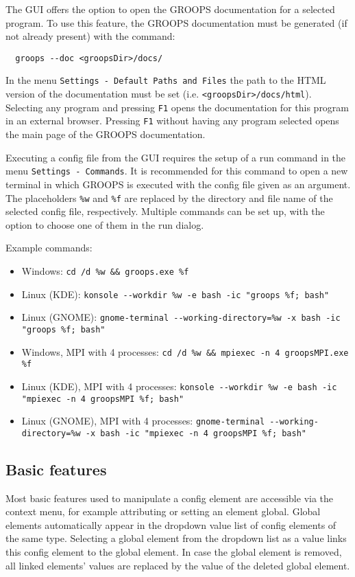 The GUI offers the option to open the GROOPS documentation for a selected program. To use this feature,
the GROOPS documentation must be generated (if not already present) with the command:
\begin{verbatim}
  groops --doc <groopsDir>/docs/
\end{verbatim}
In the menu \verb|Settings - Default Paths and Files| the path to the HTML version of the documentation must be set (i.e. \verb|<groopsDir>/docs/html|).
Selecting any program and pressing \verb|F1| opens the documentation for this program in an external browser.
Pressing \verb|F1| without having any program selected opens the main page of the GROOPS documentation.

Executing a config file from the GUI requires the setup of a run command in the menu \verb|Settings - Commands|.
It is recommended for this command to open a new terminal in which GROOPS is executed with the config file given as an argument.
The placeholders \verb|%w| and \verb|%f| are replaced by the directory and file name of the selected config file, respectively.
Multiple commands can be set up, with the option to choose one of them in the run dialog.

Example commands:
\begin{itemize}
	\item Windows: \verb|cd /d %w && groops.exe %f|
	\item Linux (KDE): \verb|konsole --workdir %w -e bash -ic "groops %f; bash"|
	\item Linux (GNOME): \verb|gnome-terminal --working-directory=%w -x bash -ic "groops %f; bash"|
	\item Windows, MPI with 4 processes: \verb|cd /d %w && mpiexec -n 4 groopsMPI.exe %f|
	\item Linux (KDE), MPI with 4 processes: \verb|konsole --workdir %w -e bash -ic "mpiexec -n 4 groopsMPI %f; bash"|
	\item Linux (GNOME), MPI with 4 processes: \verb|gnome-terminal --working-directory=%w -x bash -ic "mpiexec -n 4 groopsMPI %f; bash"|
\end{itemize}

\subsection{Basic features}

Most basic features used to manipulate a config element are accessible via the context menu,
for example attributing  or setting an element global.
Global elements automatically appear in the dropdown value list of config elements of the same type.
Selecting a global element from the dropdown list as a value links this config element to the global element.
In case the global element is removed, all linked elements' values are replaced by the value of the deleted global element.

